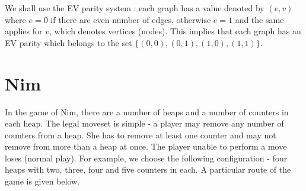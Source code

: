 \documentclass[a4paper, 12pt]{article}
\theoremstyle{remark} %
\begin{document}
We shall use the EV parity system : each graph has a value denoted by $(e,v)$ where $e=0$ if there are even number of edges, otherwise $e=1$ and the same applies for $v$, which denotes vertices (nodes). This implies that each graph has an EV parity which belongs to the set $\{(0,0), (0,1), (1,0), (1,1)\}$.

\section{Nim}
\label{nim}

In the game of Nim, there are a number of heaps and a number of counters in each heap. The legal moveset is simple - a player may remove any number of counters from a heap. She has to remove at least one counter and may not remove from more than a heap at once. The player unable to perform a move loses (normal play). For example, we choose the following configuration - four heaps with two, three, four and five counters in each. A particular route of the game is given below.\\
 
\end{document}

